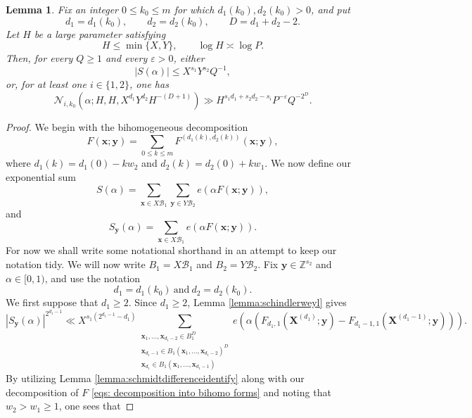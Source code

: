 \documentclass[12pt,reqno]{amsart}
\newtheorem{lemma}[theorem]{Lemma}
\theoremstyle{definition}
\theoremstyle{remark}
\numberwithin{equation}{section}
\def\bfx{{\mathbf x}}
\def\bfy{{\mathbf y}}
\def\bfX{{\mathbf X}}
\def\Z{{\mathbb Z}}\def\Q{{\mathbb Q}}
\def\a{{\alpha}} \def\bfalp{{\boldsymbol \alpha}} \def\atil{{\widetilde \alpha}}
\def\eps{\varepsilon}
\begin{document}
\begin{lemma}\label{lemma: BihomWeyl full weighted form}
    Fix an integer $0\leq k_0\leq m$ for which
    $d_1(k_0),d_2(k_0)>0$,
    and put
    \[
        d_1=d_1(k_0),
        \qquad
        d_2=d_2(k_0),
        \qquad
        D=d_1+d_2-2.
    \]
    Let $H$ be a large parameter satisfying
    \[
        H\leq\min\{X,Y\},
        \qquad
        \log H\asymp\log P.
    \]
    Then, for every $Q\geq1$ and every $\eps>0$, either
    \[
        |S(\a)|\leq X^{s_1}Y^{s_2}Q^{-1},
    \]
    or, for at least one $i\in\{1,2\}$, one has
    \[
        \mathcal N_{i,k_0}
        \left(
            \a;H,H,
            X^{d_1}Y^{d_2}H^{-(D+1)}
        \right)
        \gg
        H^{s_1d_1+s_2d_2-s_i}P^{-\eps}Q^{-2^D}.
    \]
\end{lemma}
\begin{proof}
    We begin with the bihomogeneous decomposition
    \begin{equation}\label{eqs: decomposition into bihomo forms}
        F(\bfx;\bfy)
        =\sum_{0\leq k\leq m}
        F^{(d_1(k),d_2(k))}(\bfx;\bfy),
    \end{equation}
    where $d_1(k)=d_1(0)-kw_2$ and
    $d_2(k)=d_2(0)+kw_1$. We now define our exponential sum
    \[S(\a) = \sum_{\bfx \in X \mathcal{B}_1} \sum_{\bfy \in Y \mathcal{B}_2}e(\a F(\bfx;\bfy)),\]
    and
    \begin{equation}\label{def of Sy}
        S_{\bfy}(\a) = \sum_{\bfx \in X \mathcal{B}_1}e(\a F(\bfx;\bfy)).
    \end{equation}
    For now we shall write some notational shorthand in an attempt to keep our notation tidy. We will now write $B_1 = X \mathcal{B}_1$ and $B_2 = Y \mathcal{B}_2$. Fix $\bfy \in \Z^{s_2}$ and $\a \in [0,1)$, and use the notation
    \[d_1 = d_1(k_0) \ \text{and} \ d_2 = d_2(k_0).\]
    We first suppose that $d_1\geq2$.
    Since $d_1\geq2$, Lemma \ref{lemma:schindlerweyl} gives
    \begin{equation}\label{eqs:S_y bound}
        |S_{\bfy}(\a)|^{2^{d_1 - 1}} \ll X^{s_1(2^{d_1-1}-d_1)} \sum_{\substack{\bfx_1,\ldots,\bfx_{d_1-2} \in B_1^D \\ \bfx_{d_1-1} \in B_1(\bfx_1,\ldots,\bfx_{d_1-2})^D \\ \bfx_{d_1} \in B_1(\bfx_1,\ldots,\bfx_{d_1-1})}} e(\a(F_{d_1,1}(\bfX^{(d_1)};\bfy)-F_{d_1-1,1}(\bfX^{(d_1 -1)};\bfy))).
    \end{equation}
    By utilizing Lemma \ref{lemma:schmidtdifferenceidentify} along with our decomposition of $F$ \eqref{eqs: decomposition into bihomo forms} and noting that $w_2>w_1 \ge 1$, one sees that

\end{proof}
\end{document}
